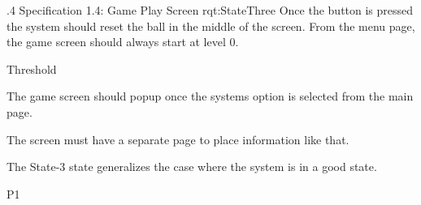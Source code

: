 \ONERQMTV
{\RqtNumberBase.4}
{Specification 1.4: Game Play Screen}
{rqt:StateThree}
{
	Once the button is pressed the system should reset the ball in the middle of the screen. From the menu page, the game screen should always start at level 0.
}
{
	\item [Phase 1] Threshold
}
{
	The game screen should popup once the systems option is selected from the main page.
}
{
	\item [1] The screen must have a separate page to place information like that.
}
{
	\item The State-3 state generalizes the case where the system is in a good state.
}
{P1}
